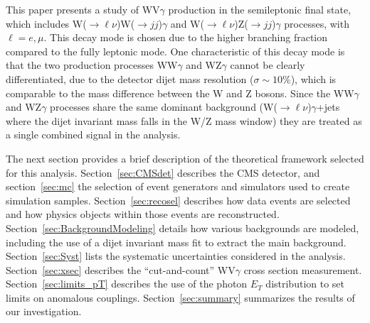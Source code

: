 This paper presents a study of WV$\gamma$ production
in the semileptonic final state, which includes W($\to\ell\nu$)W($\to
jj$)$\gamma$ and W($\to\ell\nu$)Z($\to jj$)$\gamma$ processes, with $\ell=e,\mu$.  This
decay mode is chosen due to the higher branching fraction compared to
the fully leptonic mode. One characteristic of this decay mode is that
the two production processes WW$\gamma$ and WZ$\gamma$ cannot be
clearly differentiated, due to the detector dijet mass resolution
($\sigma\sim 10$\%), which is comparable to the mass difference between
the W and Z bosons. Since the WW$\gamma$ and WZ$\gamma$ processes share the same dominant background 
(W($\to\ell\nu$)$\gamma$+jets where the dijet invariant mass falls in the W/Z mass window) they are treated as a single 
combined signal in the analysis.

The next section provides a brief description of the theoretical
framework selected for this analysis. Section~\ref{sec:CMSdet}
describes the CMS detector, and section~\ref{sec:mc} the selection of
event generators and simulators used to create simulation
samples. Section~\ref{sec:recosel} describes how data events are
selected and how physics objects within those events are
reconstructed. Section~\ref{sec:BackgroundModeling} details how various
backgrounds are modeled, including the use of a dijet invariant mass
fit to extract the main background. Section~\ref{sec:Syst} lists the
systematic uncertainties considered in the
analysis. Section~\ref{sec:xsec} describes the ``cut-and-count''
WV$\gamma$ cross section measurement. Section~\ref{sec:limits_pT}
describes the use of the photon $E_T$ distribution to set limits on
anomalous couplings. Section~\ref{sec:summary} summarizes the results
of our investigation.
